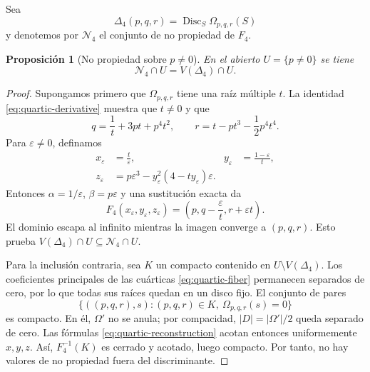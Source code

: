 \documentclass[11pt]{article}
\newtheorem{proposition}[theorem]{Proposici\'on}
\theoremstyle{definition}
\theoremstyle{remark}
\begin{document}
Sea
\[
\Delta_4(p,q,r)=\operatorname{Disc}_S\Omega_{p,q,r}(S)
\]
y denotemos por $\mathcal N_4$ el conjunto de no propiedad de $F_4$.

\begin{proposition}[No propiedad sobre $p\neq0$]
\label{prop:quartic-nonproperness}
En el abierto $U=\{p\neq0\}$ se tiene
\[
\mathcal N_4\cap U=V(\Delta_4)\cap U.
\]
\end{proposition}

\begin{proof}
Supongamos primero que $\Omega_{p,q,r}$ tiene una ra\'iz m\'ultiple $t$.
La identidad \eqref{eq:quartic-derivative} muestra que $t\neq0$ y que
\begin{equation}\label{eq:quartic-multiple-root}
q=\frac1t+3pt+p^4t^2,
\qquad
r=t-pt^3-\frac12p^4t^4.
\end{equation}
Para $\varepsilon\neq0$, definamos
\begin{equation}\label{eq:quartic-asymptotic-general}
\begin{aligned}
x_\varepsilon&=\frac{t}{\varepsilon},
&y_\varepsilon&=\frac{1-\varepsilon}{t},\\
z_\varepsilon&=p\varepsilon^3
-y_\varepsilon^2(4-ty_\varepsilon)\varepsilon.
\end{aligned}
\end{equation}
Entonces $\alpha=1/\varepsilon$, $\beta=p\varepsilon$ y una sustituci\'on
exacta da
\begin{equation}\label{eq:quartic-asymptotic-image}
F_4(x_\varepsilon,y_\varepsilon,z_\varepsilon)
=\left(p,q-\frac{\varepsilon}{t},r+\varepsilon t\right).
\end{equation}
El dominio escapa al infinito mientras la imagen converge a $(p,q,r)$.
Esto prueba
$V(\Delta_4)\cap U\subseteq\mathcal N_4\cap U$.

Para la inclusi\'on contraria, sea $K$ un compacto contenido en
$U\setminus V(\Delta_4)$. Los coeficientes principales de las cu\'articas
\eqref{eq:quartic-fiber} permanecen separados de cero, por lo que todas sus
ra\'ices quedan en un disco fijo. El conjunto de pares
\[
\{((p,q,r),s):(p,q,r)\in K,\ \Omega_{p,q,r}(s)=0\}
\]
es compacto. En \'el, $\Omega'$ no se anula; por compacidad, $|D|=|\Omega'|/2$
queda separado de cero. Las f\'ormulas
\eqref{eq:quartic-reconstruction} acotan entonces uniformemente $x,y,z$.
As\'i, $F_4^{-1}(K)$ es cerrado y acotado, luego compacto. Por tanto, no hay
valores de no propiedad fuera del discriminante.
\end{proof}
\end{document}
